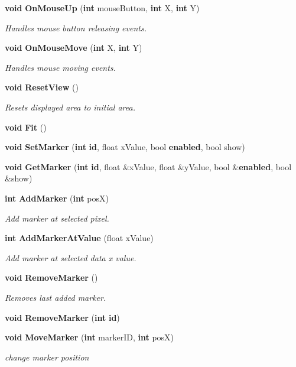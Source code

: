 \begin{DoxyCompactItemize}
{\bf void} {\bf On\+Mouse\+Up} ({\bf int} mouse\+Button, {\bf int} X, {\bf int} Y)
\begin{DoxyCompactList}\small\item\em Handles mouse button releasing events. \end{DoxyCompactList}\item 
{\bf void} {\bf On\+Mouse\+Move} ({\bf int} X, {\bf int} Y)
\begin{DoxyCompactList}\small\item\em Handles mouse moving events. \end{DoxyCompactList}\item 
{\bf void} {\bf Reset\+View} ()
\begin{DoxyCompactList}\small\item\em Resets displayed area to initial area. \end{DoxyCompactList}\item 
{\bf void} {\bf Fit} ()
\item 
{\bf void} {\bf Set\+Marker} ({\bf int} {\bf id}, float x\+Value, bool {\bf enabled}, bool show)
\item 
{\bf void} {\bf Get\+Marker} ({\bf int} {\bf id}, float \&x\+Value, float \&y\+Value, bool \&{\bf enabled}, bool \&show)
\item 
{\bf int} {\bf Add\+Marker} ({\bf int} posX)
\begin{DoxyCompactList}\small\item\em Add marker at selected pixel. \end{DoxyCompactList}\item 
{\bf int} {\bf Add\+Marker\+At\+Value} (float x\+Value)
\begin{DoxyCompactList}\small\item\em Add marker at selected data x value. \end{DoxyCompactList}\item 
{\bf void} {\bf Remove\+Marker} ()
\begin{DoxyCompactList}\small\item\em Removes last added marker. \end{DoxyCompactList}\item 
{\bf void} {\bf Remove\+Marker} ({\bf int} {\bf id})
\item 
{\bf void} {\bf Move\+Marker} ({\bf int} marker\+ID, {\bf int} posX)
\begin{DoxyCompactList}\small\item\em change marker position \end{DoxyCompactList}\item 

\end{DoxyCompactItemize}

